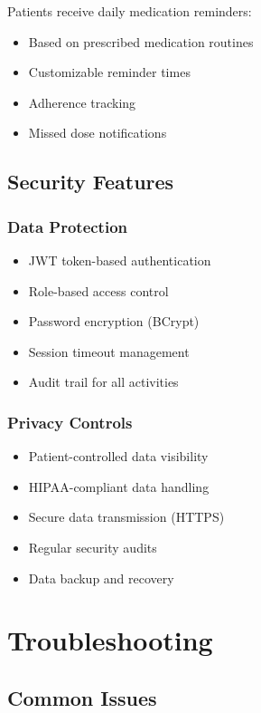 \documentclass[12pt,a4paper]{article}
\begin{document}
Patients receive daily medication reminders:
\begin{itemize}
    \item Based on prescribed medication routines
    \item Customizable reminder times
    \item Adherence tracking
    \item Missed dose notifications
\end{itemize}

\subsection{Security Features}

\subsubsection{Data Protection}

\begin{itemize}
    \item JWT token-based authentication
    \item Role-based access control
    \item Password encryption (BCrypt)
    \item Session timeout management
    \item Audit trail for all activities
\end{itemize}

\subsubsection{Privacy Controls}

\begin{itemize}
    \item Patient-controlled data visibility
    \item HIPAA-compliant data handling
    \item Secure data transmission (HTTPS)
    \item Regular security audits
    \item Data backup and recovery
\end{itemize}

\section{Troubleshooting}

\subsection{Common Issues}
\end{document}
